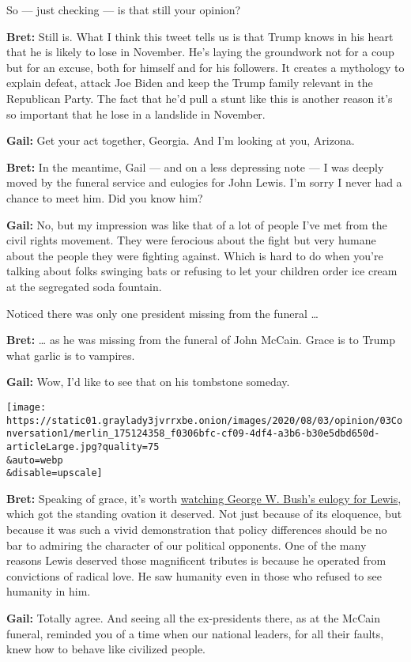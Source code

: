 So --- just checking --- is that still your opinion?

\textbf{Bret:} Still is. What I think this tweet tells us is that Trump
knows in his heart that he is likely to lose in November. He's laying
the groundwork not for a coup but for an excuse, both for himself and
for his followers. It creates a mythology to explain defeat, attack Joe
Biden and keep the Trump family relevant in the Republican Party. The
fact that he'd pull a stunt like this is another reason it's so
important that he lose in a landslide in November.

\textbf{Gail:} Get your act together, Georgia. And I'm looking at you,
Arizona.

\textbf{Bret:} In the meantime, Gail --- and on a less depressing note
--- I was deeply moved by the funeral service and eulogies for John
Lewis. I'm sorry I never had a chance to meet him. Did you know him?

\textbf{Gail:} No, but my impression was like that of a lot of people
I've met from the civil rights movement. They were ferocious about the
fight but very humane about the people they were fighting against. Which
is hard to do when you're talking about folks swinging bats or refusing
to let your children order ice cream at the segregated soda fountain.

Noticed there was only one president missing from the funeral \ldots{}

\textbf{Bret:} \ldots{} as he was missing from the funeral of John
McCain. Grace is to Trump what garlic is to vampires.

\textbf{Gail:} Wow, I'd like to see that on his tombstone someday.

\texttt{[image: https://static01.graylady3jvrrxbe.onion/images/2020/08/03/opinion/03Conversation1/merlin\_175124358\_f0306bfc-cf09-4df4-a3b6-b30e5dbd650d-articleLarge.jpg?quality=75\\\&auto=webp\\\&disable=upscale]}

\textbf{Bret:} Speaking of grace, it's worth
\href{https://www.youtube.com/watch?v=Rwvvt_mzV_Q}{watching George W.
Bush's eulogy for Lewis}, which got the standing ovation it deserved.
Not just because of its eloquence, but because it was such a vivid
demonstration that policy differences should be no bar to admiring the
character of our political opponents. One of the many reasons Lewis
deserved those magnificent tributes is because he operated from
convictions of radical love. He saw humanity even in those who refused
to see humanity in him.

\textbf{Gail:} Totally agree. And seeing all the ex-presidents there, as
at the McCain funeral, reminded you of a time when our national leaders,
for all their faults, knew how to behave like civilized people.

